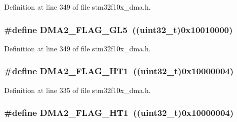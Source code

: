 Definition at line 349 of file stm32f10x\+\_\+dma.\+h.

\subsubsection[{\texorpdfstring{D\+M\+A2\+\_\+\+F\+L\+A\+G\+\_\+\+G\+L5}{DMA2_FLAG_GL5}}]{\setlength{\rightskip}{0pt plus 5cm}\#define D\+M\+A2\+\_\+\+F\+L\+A\+G\+\_\+\+G\+L5~(({\bf uint32\+\_\+t})0x10010000)}\hypertarget{group___d_m_a__flags__definition_gab0468b7a6e2fbdd5428da87252865623}{}\label{group___d_m_a__flags__definition_gab0468b7a6e2fbdd5428da87252865623}


Definition at line 349 of file stm32f10x\+\_\+dma.\+h.

\subsubsection[{\texorpdfstring{D\+M\+A2\+\_\+\+F\+L\+A\+G\+\_\+\+H\+T1}{DMA2_FLAG_HT1}}]{\setlength{\rightskip}{0pt plus 5cm}\#define D\+M\+A2\+\_\+\+F\+L\+A\+G\+\_\+\+H\+T1~(({\bf uint32\+\_\+t})0x10000004)}\hypertarget{group___d_m_a__flags__definition_ga2264376d92756f07122883c8f3359258}{}\label{group___d_m_a__flags__definition_ga2264376d92756f07122883c8f3359258}


Definition at line 335 of file stm32f10x\+\_\+dma.\+h.

\subsubsection[{\texorpdfstring{D\+M\+A2\+\_\+\+F\+L\+A\+G\+\_\+\+H\+T1}{DMA2_FLAG_HT1}}]{\setlength{\rightskip}{0pt plus 5cm}\#define D\+M\+A2\+\_\+\+F\+L\+A\+G\+\_\+\+H\+T1~(({\bf uint32\+\_\+t})0x10000004)}\hypertarget{group___d_m_a__flags__definition_ga2264376d92756f07122883c8f3359258}{}\label{group___d_m_a__flags__definition_ga2264376d92756f07122883c8f3359258}


